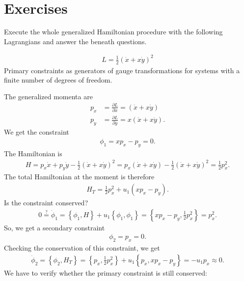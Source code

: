 \chapter{Exercises}

Execute the whole generalized Hamiltonian procedure with the following Lagrangians and answer the beneath questions.

\begin{exercise}
\begin{align*}
L = \frac{1}{2} (\dot{x} + x \dot{y})^2 
\end{align*}
Primary constraints as generators of gauge transformations for systems with a finite number of degrees of freedom.
\end{exercise}
\begin{solution}
The generalized momenta are
\begin{align*}
p_x &= \frac{\partial L}{\partial \dot{x}} = (\dot{x} + x \dot{y}) \\
p_y &= \frac{\partial L}{\partial \dot{y}} = x (\dot{x} + x \dot{y}).
\end{align*}
We get the constraint 
\begin{align*}
\phi_1 = x p_x - p_y = 0.
\end{align*}
The Hamiltonian is
\begin{align*}
H = p_x \dot{x} + p_y \dot{y} - \frac{1}{2} (\dot{x} + x \dot{y})^2 = p_x (\dot{x} + x \dot{y}) - \frac{1}{2} (\dot{x} + x \dot{y})^2 = \frac{1}{2} p_x^2.
\end{align*}
The total Hamiltonian at the moment is therefore
\begin{align*}
H_T = \frac{1}{2} p_x^2 + u_1 (x p_x - p_y).
\end{align*}
Is the constraint conserved?
\begin{align*}
0 \overset{?}{=} \dot{\phi}_1 = \left \{ \phi_1,H \right \} + u_1 \left \{ \phi_1,\phi_1 \right \} = \left \{ x p_x - p_y,\frac{1}{2} p_x^2 \right \} = p_x^2.
\end{align*}
So, we get a secondary constraint
\begin{align*}
\phi_2 = p_x = 0.
\end{align*}
Checking the conservation of this constraint, we get
\begin{align*}
\dot{\phi}_2 = \left \{ \phi_2,H_T \right \} = \left \{ p_x,\frac{1}{2} p_x^2 \right \} + u_1 \left \{ p_x,x p_x - p_y \right \} = - u_1 p_x \approx 0.
\end{align*}
We have to verify whether the primary constraint is still conserved:

\end{solution}
